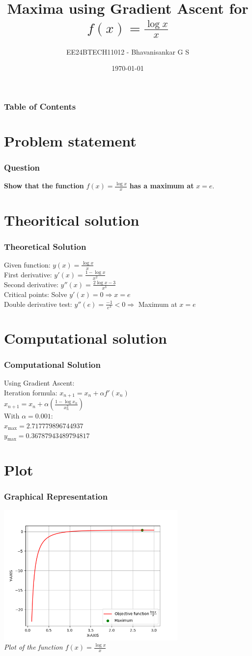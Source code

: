 \documentclass{beamer}
\title{Maxima using Gradient Ascent for $f(x) = \frac{\log{x}}{x}$}
\author{EE24BTECH11012 - Bhavanisankar G S}
\date{\today}
\begin{document}
\frame{\titlepage}


\begin{frame}
\frametitle{Table of Contents}
\tableofcontents
\end{frame}

\section{Problem statement}
\begin{frame}
\frametitle{Question}
\textbf{Show that the function} $f(x) = \frac{\log{x}}{x}$ \textbf{has a maximum at} $x = e$.
\end{frame}

\section{Theoritical solution}
\begin{frame}
\frametitle{Theoretical Solution}
Given function: $y(x) = \frac{\log{x}}{x}$ \\[0.2cm]
First derivative: $y'(x) = \frac{1 - \log{x}}{x^2}$ \\[0.2cm]
Second derivative: $y''(x) = \frac{2 \log{x} - 3}{x^3}$\\[0.2cm]
Critical points: Solve $y'(x) = 0 \Rightarrow x = e$ \\[0.2cm]
Double derivative test: $y''(e) = \frac{-1}{e^3} < 0 \Rightarrow$ Maximum at $x = e$
\end{frame}

\section{Computational solution}
\begin{frame}
\frametitle{Computational Solution}
Using Gradient Ascent: \\[0.2cm]
Iteration formula: $x_{n+1} = x_n + \alpha f'(x_n)$ \\[0.2cm]
		   $x_{n+1} = x_{n} + \alpha \left( {\frac{1 - \log{x_{n}}}{x_{n}^2}} \right)$ \\[0.2cm]
With $\alpha = 0.001$: \\[0.2cm]
$x_{\text{max}} = 2.717779896744937$ \\
$y_{\text{max}} = 0.36787943489794817$
\end{frame}

\section{Plot}
\begin{frame}
\frametitle{Graphical Representation}
\begin{center}
\includegraphics[width=0.7\textwidth]{fig.png} \\
\textit{Plot of the function $f(x) = \frac{\log{x}}{x}$}
\end{center}
\end{frame}
\end{document}
